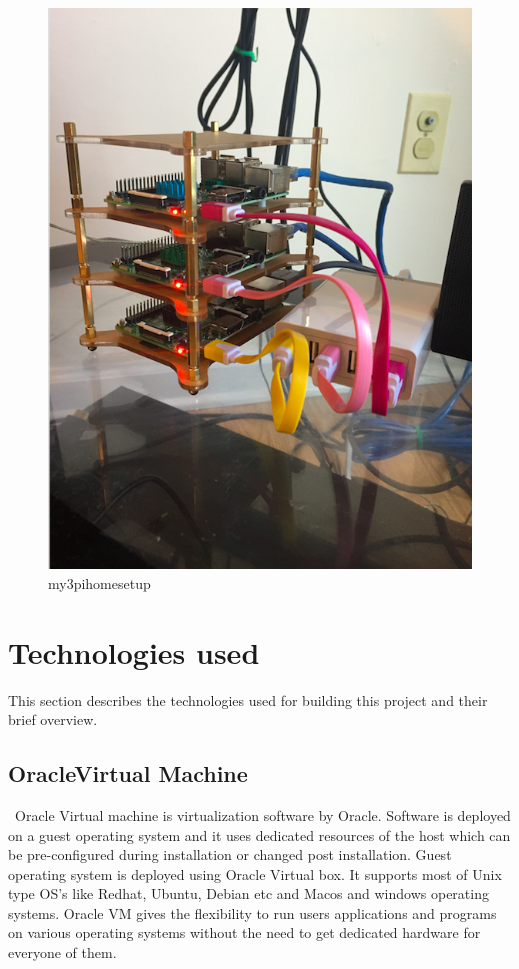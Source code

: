 \begin{figure}[!ht]
  \centering\includegraphics[width=\columnwidth]{images/hid-sp18-413-my3pi.png}
  \caption{my3pihomesetup}\label{F:setup}
\end{figure}

\section{Technologies used}
This section describes the technologies used for building this project
and their brief overview. 

\subsection{OracleVirtual Machine}
~\cite{hid-sp18-413-OracleVM}Oracle Virtual machine is virtualization
software by Oracle. Software is deployed on a guest operating system
and it uses dedicated resources of the host which can be
pre-configured during installation or changed post installation. Guest
operating system is deployed using Oracle Virtual box. It supports
most of Unix type OS's like Redhat, Ubuntu, Debian etc and Macos and
windows operating systems. Oracle VM gives the flexibility to run
users applications and programs on various operating systems without
the need to get dedicated hardware for everyone of them.

